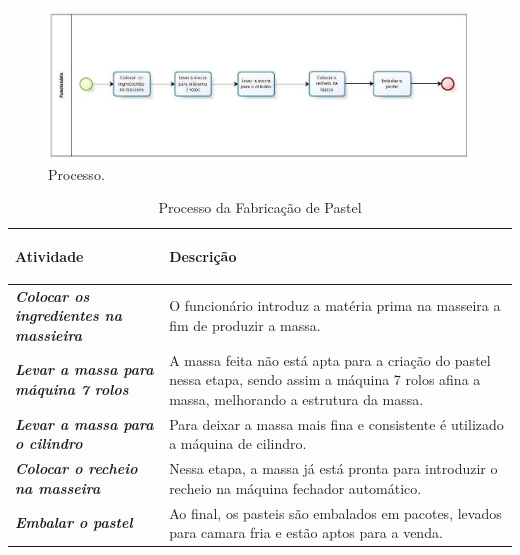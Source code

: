 \begin{figure}[H]
  \includegraphics[width=1.1\textwidth,keepaspectratio=true,scale=0.5]{figuras/processo.eps}
    \caption{Processo.}
    \label{fig:processo}
\end{figure}

\begin{table}[H]
    \centering
      \begin{tabular}{| m{8cm} | m{8cm} |}
        \hline
        \begin{center} \textbf{Atividade} \end{center}	&	\begin{center} \textbf{Descrição} \end{center}		\\ \hline
        \textit{\textbf{Colocar os ingredientes na massieira}}	&	O funcionário introduz a matéria prima na masseira a fim de produzir a massa. \\ \hline
         \textit{\textbf{Levar a massa para máquina 7 rolos}} & A massa feita não está apta para a criação do pastel nessa etapa, sendo assim a máquina 7 rolos afina a massa, melhorando a estrutura da massa. \\ \hline
        \textit{\textbf{Levar a massa para o cilindro}} &	Para deixar a massa mais fina e consistente é utilizado a máquina de cilindro. \\ \hline
        \textit{\textbf{Colocar o recheio na masseira}}	&	Nessa etapa, a massa já está pronta para introduzir o recheio na máquina fechador automático. \\ \hline
        \textit{\textbf{Embalar o pastel}}	&	Ao final, os pasteis são embalados em pacotes, levados para camara fria e estão aptos para a venda. \\ \hline
      \end{tabular}
      \caption{Processo da Fabricação de Pastel}
      \label{tabela:processofabrica}
  \end{table}